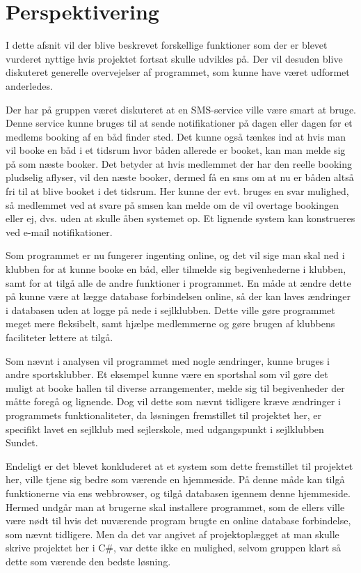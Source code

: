 \chapter{Perspektivering}

I dette afsnit vil der blive beskrevet forskellige funktioner som der er blevet vurderet nyttige hvis projektet fortsat
skulle udvikles på. Der vil desuden blive diskuteret generelle overvejelser af programmet, som kunne have været udformet
anderledes. 

Der har på gruppen været diskuteret at en SMS-service ville være smart at bruge. Denne service kunne bruges til at sende
notifikationer på dagen eller dagen før et medlems booking af en båd finder sted. Det kunne også tænkes ind at hvis man
vil booke en båd i et tidsrum hvor båden allerede er booket, kan man melde sig på som næste booker. Det betyder at hvis
medlemmet der har den reelle booking pludselig aflyser, vil den næste booker, dermed få en sms om at nu er båden altså
fri til at blive booket i det tidsrum. Her kunne der evt. bruges en svar mulighed, så medlemmet ved at svare på smsen
kan melde om de vil overtage bookingen eller ej, dvs. uden at skulle åben systemet op. Et lignende system kan
konstrueres ved e-mail notifikationer.

Som programmet er nu fungerer ingenting online, og det vil sige man skal ned i klubben for at kunne booke en båd, eller
tilmelde sig begivenhederne i klubben, samt for at tilgå alle de andre funktioner i programmet. En måde at ændre dette på kunne være
at lægge database forbindelsen online, så der kan laves ændringer i databasen uden at logge på nede i sejlklubben. Dette
ville gøre programmet meget mere fleksibelt, samt hjælpe medlemmerne og gøre brugen af klubbens faciliteter lettere at
tilgå.

Som nævnt i analysen vil programmet med nogle ændringer, kunne bruges i andre sportsklubber. Et eksempel kunne være en
sportshal som vil gøre det muligt at booke hallen til diverse arrangementer, melde sig til begivenheder der måtte foregå
og lignende. Dog vil dette som nævnt tidligere kræve ændringer i programmets funktionaliteter, da løsningen fremstillet
til projektet her, er specifikt lavet en sejlklub med sejlerskole, med udgangspunkt i sejlklubben Sundet.

Endeligt er det blevet konkluderet at et system som dette fremstillet til projektet her, ville tjene sig bedre som
værende en hjemmeside. På denne måde kan tilgå funktionerne via ens webbrowser, og tilgå databasen igennem denne
hjemmeside. Hermed undgår man at brugerne skal installere programmet, som de ellers ville være nødt til hvis det
nuværende program brugte en online database forbindelse, som nævnt tidligere. Men da det var angivet af projektoplægget
at man skulle skrive projektet her i C\#, var dette ikke en mulighed, selvom gruppen klart så dette som værende den
bedste løsning.

